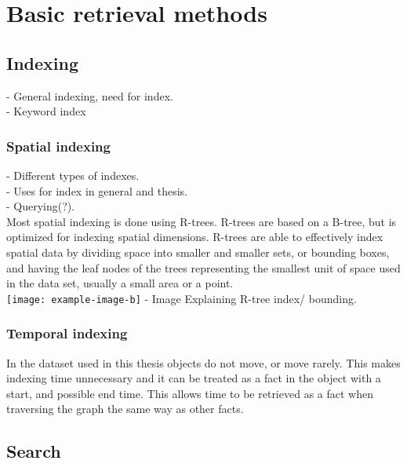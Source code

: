 
\chapter{Basic retrieval methods}

\section{Indexing}

- General indexing, need for index.\\
- Keyword index\\

\subsection{Spatial indexing}
- Different types of indexes.\\
- Uses for index in general and thesis.\\
- Querying(?).\\
Most spatial indexing is done using R-trees. R-trees are based on a B-tree, but is optimized for indexing spatial dimensions. R-trees are able to effectively index spatial data by dividing space into smaller and smaller sets, or bounding boxes, and having the leaf nodes of the trees representing the smallest unit of space used in the data set, usually a small area or a point.\\

\texttt{[image: example-image-b]}
- Image Explaining R-tree index/ bounding.

\subsection{Temporal indexing}
In the dataset used in this thesis objects do not move, or move rarely. This makes indexing time unnecessary and it can be treated as a fact in the object with a start, and possible end time. This allows time to be retrieved as a fact when traversing the graph the same way as other facts.\\

\section{Search}
